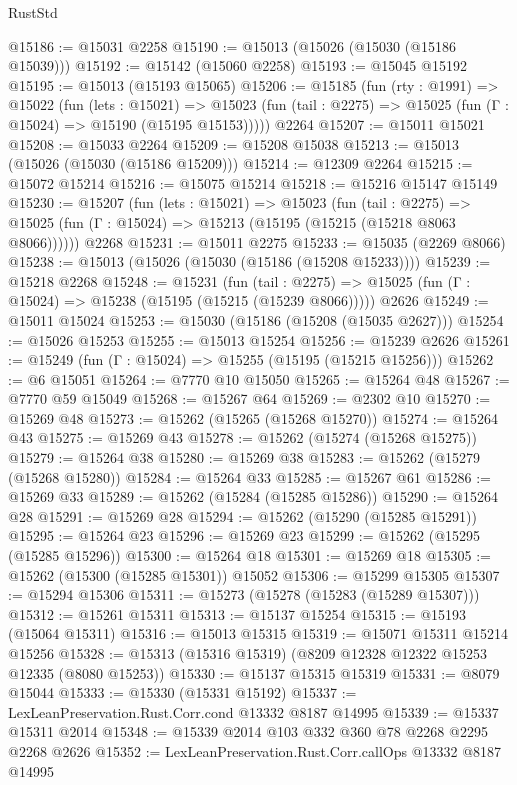 \begin{lexlean}{RustStd}
\begin{coremodule}
@15186 := @15031 @2258
@15190 := @15013 (@15026 (@15030 (@15186 @15039)))
@15192 := @15142 (@15060 @2258)
@15193 := @15045 @15192
@15195 := @15013 (@15193 @15065)
@15206 := @15185
    (fun (rty : @1991) =>
    @15022
      (fun (lets : @15021) =>
      @15023 (fun (tail : @2275) => @15025 (fun (Γ : @15024) => @15190 (@15195 @15153)))))
    @2264
@15207 := @15011 @15021
@15208 := @15033 @2264
@15209 := @15208 @15038
@15213 := @15013 (@15026 (@15030 (@15186 @15209)))
@15214 := @12309 @2264
@15215 := @15072 @15214
@15216 := @15075 @15214
@15218 := @15216 @15147 @15149
@15230 := @15207
    (fun (lets : @15021) =>
    @15023
      (fun (tail : @2275) =>
      @15025 (fun (Γ : @15024) => @15213 (@15195 (@15215 (@15218 @8063 @8066))))))
    @2268
@15231 := @15011 @2275
@15233 := @15035 (@2269 @8066)
@15238 := @15013 (@15026 (@15030 (@15186 (@15208 @15233))))
@15239 := @15218 @2268
@15248 := @15231
    (fun (tail : @2275) => @15025 (fun (Γ : @15024) => @15238 (@15195 (@15215 (@15239 @8066)))))
    @2626
@15249 := @15011 @15024
@15253 := @15030 (@15186 (@15208 (@15035 @2627)))
@15254 := @15026 @15253
@15255 := @15013 @15254
@15256 := @15239 @2626
@15261 := @15249 (fun (Γ : @15024) => @15255 (@15195 (@15215 @15256)))
@15262 := @6 @15051
@15264 := @7770 @10 @15050
@15265 := @15264 @48
@15267 := @7770 @59 @15049
@15268 := @15267 @64
@15269 := @2302 @10
@15270 := @15269 @48
@15273 := @15262 (@15265 (@15268 @15270))
@15274 := @15264 @43
@15275 := @15269 @43
@15278 := @15262 (@15274 (@15268 @15275))
@15279 := @15264 @38
@15280 := @15269 @38
@15283 := @15262 (@15279 (@15268 @15280))
@15284 := @15264 @33
@15285 := @15267 @61
@15286 := @15269 @33
@15289 := @15262 (@15284 (@15285 @15286))
@15290 := @15264 @28
@15291 := @15269 @28
@15294 := @15262 (@15290 (@15285 @15291))
@15295 := @15264 @23
@15296 := @15269 @23
@15299 := @15262 (@15295 (@15285 @15296))
@15300 := @15264 @18
@15301 := @15269 @18
@15305 := @15262 (@15300 (@15285 @15301)) @15052
@15306 := @15299 @15305
@15307 := @15294 @15306
@15311 := @15273 (@15278 (@15283 (@15289 @15307)))
@15312 := @15261 @15311
@15313 := @15137 @15254
@15315 := @15193 (@15064 @15311)
@15316 := @15013 @15315
@15319 := @15071 @15311 @15214 @15256
@15328 := @15313 (@15316 @15319) (@8209 @12328 @12322 @15253 @12335 (@8080 @15253))
@15330 := @15137 @15315 @15319
@15331 := @8079 @15044
@15333 := @15330 (@15331 @15192)
@15337 := LexLeanPreservation.Rust.Corr.cond @13332 @8187 @14995
@15339 := @15337 @15311 @2014
@15348 := @15339 @2014 @103 @332 @360 @78 @2268 @2295 @2268 @2626
@15352 := LexLeanPreservation.Rust.Corr.callOps @13332 @8187 @14995

\end{coremodule}
\end{lexlean}
